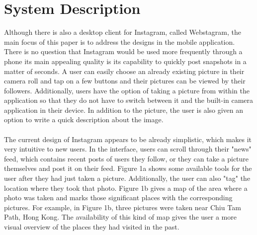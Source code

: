 \documentclass[11pt]{article}
\begin{document}
\section{System Description}
\label{System Description}
   \indent 
   \indent Although there is also a desktop client for Instagram, called Webstagram, the main focus of this paper is to address the designs in the mobile application. There is no question that Instagram would be used more frequently through a phone its main appealing quality is its capability to quickly post snapshots in a matter of seconds. A user can easily choose an already existing picture in their camera roll and tap on a few buttons and their pictures can be viewed by their followers. Additionally, users have the option of taking a picture from within the application so that they do not have to switch between it and the built-in camera application in their device. In addition to the picture, the user is also given an option to write a quick description about the image. \\ \\
   \indent The current design of Instagram appears to be already simplistic, which makes it very intuitive to new users. In the interface, users can scroll through their "news" feed, which contains recent posts of users they follow, or they can take a picture themselves and post it on their feed. Figure 1a shows some available tools for the user after they had just taken a picture. Additionally, the user can also "tag" the location where they took that photo. Figure 1b gives a map of the area where a photo was taken and marks those significant places with the corresponding pictures. For example, in Figure 1b, three pictures were taken near Chiu Tam Path, Hong Kong. The availability of this kind of map gives the user a more visual overview of the places they had visited in the past. 
   
\end{document}

